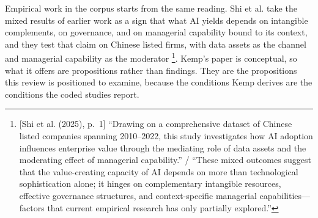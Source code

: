 Empirical work in the corpus starts from the same reading. Shi et al. take the mixed
results of earlier work as a sign that what AI yields depends on intangible complements,
on governance, and on managerial capability bound to its context, and they test that
claim on Chinese listed firms, with data assets as the channel and managerial capability
as the moderator \parencite[p.~1]{shi2025value}\footnote{[Shi et al. (2025), p.~1] ``Drawing on a
comprehensive dataset of Chinese listed companies spanning 2010--2022, this study
investigates how AI adoption influences enterprise value through the mediating role of
data assets and the moderating effect of managerial capability.'' / ``These mixed
outcomes suggest that the value-creating capacity of AI depends on more than technological
sophistication alone; it hinges on complementary intangible resources, effective
governance structures, and context-specific managerial capabilities---factors that current
empirical research has only partially explored.''}. Kemp's paper is conceptual, so what it
offers are propositions rather than findings. They are the propositions this review is
positioned to examine, because the conditions Kemp derives are the conditions the coded
studies report.
